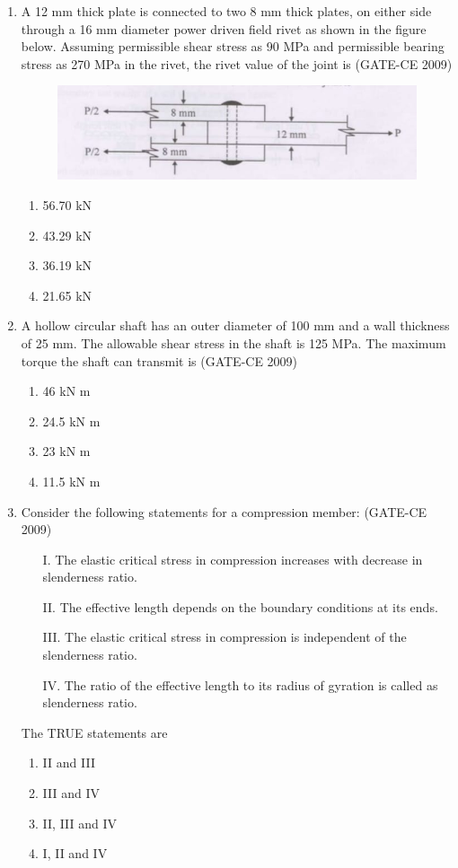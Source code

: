 \documentclass[journal,12pt,onecolumn]{article}
\theoremstyle{remark}
\begin{document}
\begin{enumerate}
    \item A 12 mm thick plate is connected to two 8 mm thick plates, on either side through a 16 mm diameter power driven field rivet as shown in the figure below. Assuming permissible shear stress as 90 MPa and permissible bearing stress as 270 MPa in the rivet, the rivet value of the joint is (GATE-CE 2009)
    \begin{figure}[H]
    \centering
    \includegraphics[width=0.7\columnwidth]{figs/image2.jpg}
    \caption{}
    \label{fig:placeholder}
    \end{figure}
    
    \begin{enumerate}
        \item 56.70 kN 
        \item 43.29 kN
        \item 36.19 kN 
        \item 21.65 kN
    \end{enumerate}
    
    \item A hollow circular shaft has an outer diameter of 100 mm and a wall thickness of 25 mm. The allowable shear stress in the shaft is 125 MPa. The maximum torque the shaft can transmit is (GATE-CE 2009)
    \begin{enumerate}
        \item 46 kN m 
        \item 24.5 kN m 
        \item 23 kN m 
        \item 11.5 kN m
    \end{enumerate}
    
    \item Consider the following statements for a compression member: (GATE-CE 2009)
    \begin{itemize}
        \item[I.] The elastic critical stress in compression increases with decrease in slenderness ratio.
        \item[II.] The effective length depends on the boundary conditions at its ends.
        \item[III.] The elastic critical stress in compression is independent of the slenderness ratio.
        \item[IV.] The ratio of the effective length to its radius of gyration is called as slenderness ratio.
    \end{itemize}
    The TRUE statements are \\
    \begin{enumerate}
        \item II and III 
        \item III and IV 
        \item II, III and IV 
        \item I, II and IV
    \end{enumerate}
    

\end{enumerate}
\end{document}
